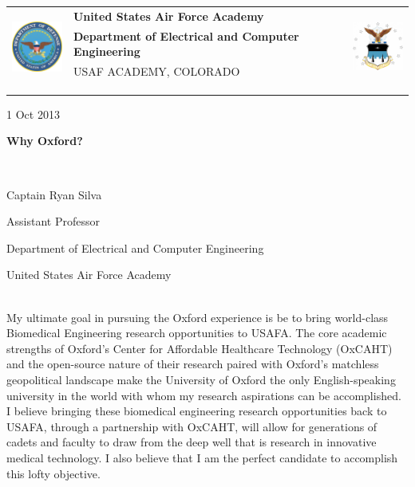\documentclass{article}
\begin{document}
	\noindent \begin{tabu} to \textwidth{l X[c] r}
	 & 
	\textbf{United States Air Force Academy} &  
	\\
	& \textbf{Department of Electrical and Computer Engineering} & \\
	& \tiny{USAF ACADEMY, COLORADO}\\
	\\ \\ \\
	\end{tabu}
\newpage
	\hfill 1 Oct 2013
	\centerline{\LARGE{\textbf{Why Oxford?}}} \hspace{0pt} \\
	\centerline{\Large{Captain Ryan Silva}}
	\centerline{\large{Assistant Professor}}
	\centerline{\large{Department of Electrical and Computer Engineering}}
	\centerline{\large{United States Air Force Academy}} \hspace{0pt} \\
\indent My ultimate goal in pursuing the Oxford experience is be to bring world-class
Biomedical Engineering research opportunities to USAFA. The core academic
strengths of Oxford's Center for Affordable Healthcare Technology (OxCAHT) and
the open-source nature of their research paired with Oxford's matchless
geopolitical landscape make the University of Oxford the only English-speaking
university in the world with whom my research aspirations can be accomplished.
I believe bringing these biomedical engineering research opportunities back
to USAFA, through a partnership with OxCAHT, will allow for generations of cadets
and faculty to draw from the deep well that is research in innovative medical technology.
I also believe that I am the perfect candidate to accomplish
this lofty objective.
\end{document}
